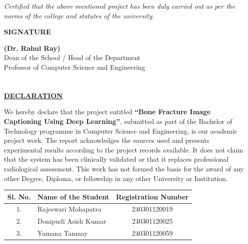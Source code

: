 \documentclass{article}
\begin{document}
\textit{Certified that the above mentioned project has been duly carried out as per the norms of the college and statutes of the university.}\par\vspace{1.5cm}

\begin{flushright}
\textbf{SIGNATURE}\par\vspace{1.2cm}
\textbf{(Dr. Rahul Ray)}\\
Dean of the School / Head of the Department\\
Professor of Computer Science and Engineering
\end{flushright}

\vfill
\newpage

\section*{}
\begin{center}
\underline{\LARGE \textbf{DECLARATION}}\par\vspace{1.5cm}
\end{center}

\large{We hereby declare that the project entitled \textbf{``Bone Fracture Image Captioning Using Deep Learning''}, submitted as part of the Bachelor of Technology programme in Computer Science and Engineering, is our academic project work. The report acknowledges the sources used and presents experimental results according to the project records available. It does not claim that the system has been clinically validated or that it replaces professional radiological assessment. This work has not formed the basis for the award of any other Degree, Diploma, or fellowship in any other University or Institution.}\par\vspace{1.0cm}

\begin{table}[h]
\centering
\begin{tabular}{clc}
\toprule
\textbf{Sl. No.} & \textbf{Name of the Student} & \textbf{Registration Number} \\
\midrule
1. & Rajeswari Mohapatra & 240301120019 \\
2. & Donipudi Asish Kumar & 240301120025 \\
3. & Yamana Tanmay & 240301120059 \\
\bottomrule
\end{tabular}
\end{table}
\end{document}
